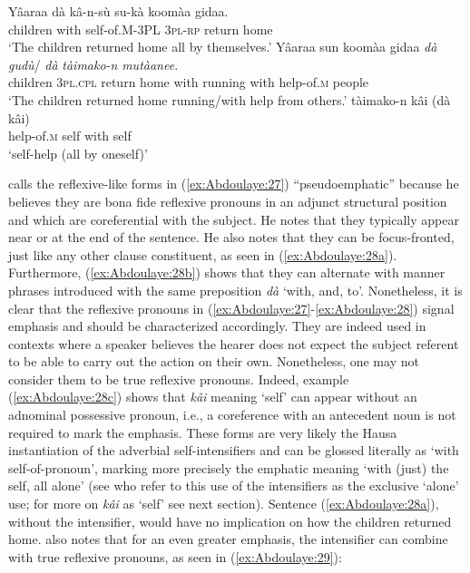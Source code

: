 \documentclass[output=paper]{langscibook}
\begin{document}
\ea%
    \label{ex:Abdoulaye:28}
    \ea \label{ex:Abdoulaye:28a}
   \gll  Yâaraa  dà  kâ-n-sù  su-kà  koomàa  gidaa.\\
    children  with  self-of.\textsc{M-3PL}  \textsc{3pl-rp}  return  home\\
    \glt `The children returned home all by themselves.’
    \ex \label{ex:Abdoulaye:28b}
   \gll  Yâaraa  sun  koomàa  gidaa  \textit{dà}  \textit{gudù}/  \textit{dà}  \textit{tàimako-n}  \textit{mutàanee}.\\
    children  \textsc{3pl.cpl}  return  home  with  running  with  help-of.\textsc{m}  people\\
    \glt `The children returned home running/with help from others.’
    \ex \label{ex:Abdoulaye:28c}
     \gll tàimako-n  kâi  (dà  kâi)\\
    help-of.\textsc{m}  self  with  self\\
    \glt `self-help (all by oneself)’
    \z
\z


 
\citet{Newman2000} calls the reflexive-like forms in (\ref{ex:Abdoulaye:27}) “pseudoemphatic” because he believes they are bona fide reflexive pronouns in an adjunct structural position and which are coreferential with the subject. He notes that they typically appear near or at the end of the sentence. He also notes that they can be focus-fronted, just like any other clause constituent, as seen in (\ref{ex:Abdoulaye:28a}). Furthermore, (\ref{ex:Abdoulaye:28b}) shows that they can alternate with manner phrases introduced with the same preposition \textit{dà} ‘with, and, to’. Nonetheless, it is clear that the reflexive pronouns in (\ref{ex:Abdoulaye:27}-\ref{ex:Abdoulaye:28}) signal emphasis and should be characterized accordingly. They are indeed used in contexts where a speaker believes the hearer does not expect the subject referent to be able to carry out the action on their own. Nonetheless, one may not consider them to be true reflexive pronouns. Indeed, example (\ref{ex:Abdoulaye:28c}) shows that \textit{kâi} meaning ‘self’ can appear without an adnominal possessive pronoun, i.e., a coreference with an antecedent noun is not required to mark the emphasis. These forms are very likely the Hausa instantiation of the adverbial self-intensifiers and can be glossed literally as ‘with self-of-pronoun’, marking more precisely the emphatic meaning ‘with (just) the self, all alone’ (see \citealt[44]{KoenigSiemund2000} who refer to this use of the intensifiers as the exclusive ‘alone’ use; for more on \textit{kâi} as ‘self’ see next section). Sentence (\ref{ex:Abdoulaye:28a}), without the intensifier, would have no implication on how the children returned home. \citet[529]{Newman2000} also notes that for an even greater emphasis, the intensifier can combine with true reflexive pronouns, as seen in (\ref{ex:Abdoulaye:29}):
\end{document}
